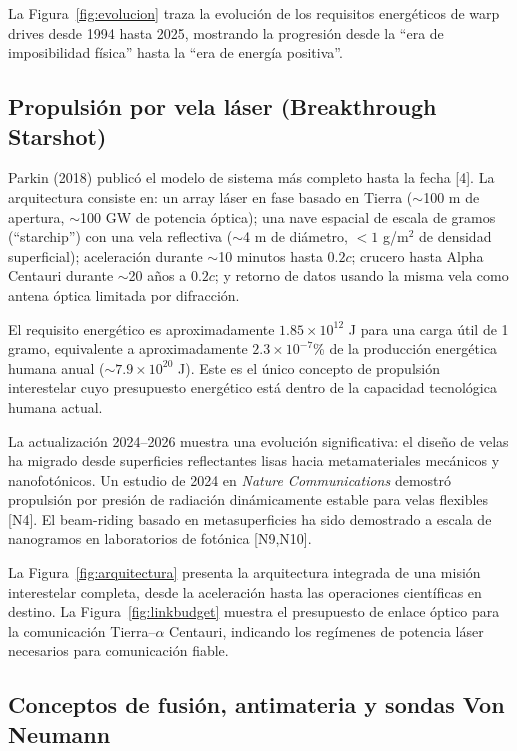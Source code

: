 \documentclass[11pt,a4paper,onecolumn]{article}
\begin{document}
La Figura~\ref{fig:evolucion} traza la evolución de los requisitos energéticos de warp drives desde 1994 hasta 2025, mostrando la progresión desde la ``era de imposibilidad física'' hasta la ``era de energía positiva''.

\subsection{Propulsión por vela láser (Breakthrough Starshot)}

Parkin (2018) publicó el modelo de sistema más completo hasta la fecha [4]. La arquitectura consiste en: un array láser en fase basado en Tierra ($\sim$100 m de apertura, $\sim$100 GW de potencia óptica); una nave espacial de escala de gramos (``starchip'') con una vela reflectiva ($\sim$4 m de diámetro, $<1$ g/m$^2$ de densidad superficial); aceleración durante $\sim$10 minutos hasta $0.2c$; crucero hasta Alpha Centauri durante $\sim$20 años a $0.2c$; y retorno de datos usando la misma vela como antena óptica limitada por difracción.

El requisito energético es aproximadamente $1.85\times10^{12}$ J para una carga útil de 1 gramo, equivalente a aproximadamente $2.3\times10^{-7}$\% de la producción energética humana anual ($\sim7.9\times10^{20}$ J). Este es el único concepto de propulsión interestelar cuyo presupuesto energético está dentro de la capacidad tecnológica humana actual.

La actualización 2024--2026 muestra una evolución significativa: el diseño de velas ha migrado desde superficies reflectantes lisas hacia metamateriales mecánicos y nanofotónicos. Un estudio de 2024 en \textit{Nature Communications} demostró propulsión por presión de radiación dinámicamente estable para velas flexibles [N4]. El beam-riding basado en metasuperficies ha sido demostrado a escala de nanogramos en laboratorios de fotónica [N9,N10].

La Figura~\ref{fig:arquitectura} presenta la arquitectura integrada de una misión interestelar completa, desde la aceleración hasta las operaciones científicas en destino. La Figura~\ref{fig:linkbudget} muestra el presupuesto de enlace óptico para la comunicación Tierra--$\alpha$ Centauri, indicando los regímenes de potencia láser necesarios para comunicación fiable.

\subsection{Conceptos de fusión, antimateria y sondas Von Neumann}
\end{document}
